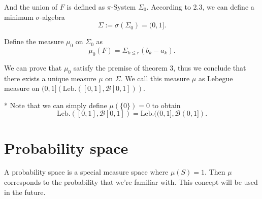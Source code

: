 And the union of $F$ is defined as $\pi$-System $\Sigma_0$. According to 2.3, we can define a minimum $\sigma$-algebra 
$$\Sigma := \sigma(\Sigma_0) = \mathcal (0,1].$$

Define the measure $\mu_0$ on $\Sigma_0$ as 
$$\mu_0(F) = \Sigma_{k\leq r}(b_k-a_k).$$

We can prove that $\mu_0$ satisfy the premise of theorem 3, thus we conclude that there exists a unique measure $\mu$ on $\Sigma$. We call this measure $\mu$ as Lebegue measure on $(0,1] (\text{Leb.} ([0,1],\mathcal B[0,1])).$

* Note that we can simply define $\mu(\{0\}) = 0$ to obtain 
$$\text{Leb.} ([0,1],\mathcal B[0,1]) = \text{Leb.} ((0,1],\mathcal B(0,1]).$$
\section{Probability space} 
A probability space is a special measure space where $\mu(S) = 1$. Then $\mu$ corresponds to the probability that we're familiar with. This concept will be used in the future.























